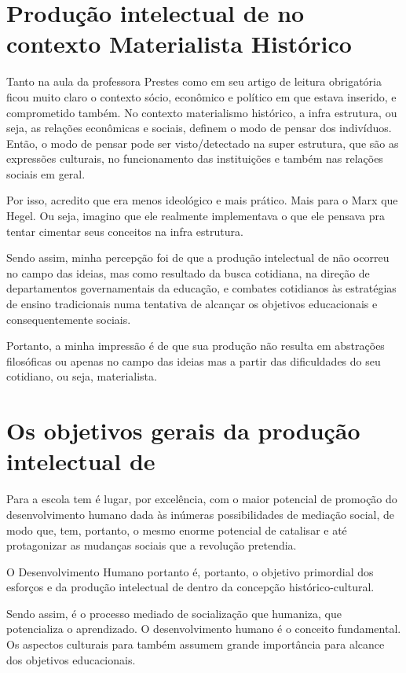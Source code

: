 \documentclass{../../common-shared/cls/Article_Class_RevInfor}
\begin{document}
\section{Produção intelectual de \Vig{} no contexto Materialista Histórico}

Tanto na aula da professora Prestes como em seu artigo de leitura obrigatória  ficou muito claro o contexto sócio, econômico e político em que \Vig{} estava inserido, e comprometido também.
No contexto materialismo histórico, a infra
estrutura, ou seja, as relações econômicas e sociais, definem o modo
de pensar dos indivíduos. Então, o modo de pensar pode ser visto/detectado na
super estrutura, que são as expressões culturais, no funcionamento das instituições e também nas
relações sociais em geral. 

Por isso, acredito que \Vig{} era menos ideológico e mais prático. Mais para o Marx que Hegel. Ou
seja, imagino que ele realmente implementava o que ele pensava pra
tentar cimentar seus conceitos na infra estrutura.

Sendo assim, minha percepção foi de que a produção intelectual de
\Vig{} não ocorreu no campo das ideias, mas como resultado da busca
cotidiana, na direção de departamentos governamentais da educação, e
combates cotidianos às estratégias de ensino tradicionais numa
tentativa de alcançar os objetivos educacionais e consequentemente
sociais.

Portanto, a minha impressão é de que sua produção não resulta em abstrações
filosóficas ou apenas no campo das ideias mas a partir das
dificuldades do seu cotidiano, ou seja, materialista.

\section{Os objetivos gerais da produção intelectual de \Vig{}}

Para \Vig{} a escola tem é lugar, por excelência, com o maior potencial de promoção do desenvolvimento humano dada às inúmeras possibilidades de mediação social, de modo que, tem, portanto, o mesmo enorme potencial de catalisar e até protagonizar as mudanças sociais que a revolução pretendia.

O Desenvolvimento Humano portanto é, portanto, o objetivo primordial dos esforços e da produção intelectual de \Vig{} dentro da concepção histórico-cultural.

Sendo assim, é o processo mediado de socialização que humaniza, que potencializa
o aprendizado. O desenvolvimento humano é o conceito fundamental. Os
aspectos culturais para \Vig{} também assumem grande importância para
alcance dos objetivos educacionais.
\end{document}
